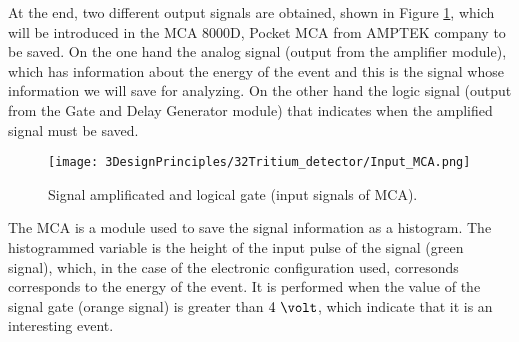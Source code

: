 At the end, two different output signals are obtained, shown in Figure \ref{fig:InputSignalsMCA}, which will be introduced in the MCA 8000D, Pocket MCA from AMPTEK company \cite{DataSheetMCA} to be saved. On the one hand the analog signal (output from the amplifier module), which has information about the energy of the event and this is the signal whose information we will save for analyzing. On the other hand the logic signal (output from the Gate and Delay Generator module) that indicates when the amplified signal must be saved.

\begin{figure}[htbp]
\centering
\texttt{[image: 3DesignPrinciples/32Tritium\_detector/Input\_MCA.png]}
\caption{Signal amplificated and logical gate (input signals of MCA).\label{fig:InputSignalsMCA}}
\end{figure}

The MCA is a module used to save the signal information as a histogram. The histogrammed variable is the height of the input pulse of the signal (green signal), which, in the case of the electronic configuration used, corresonds corresponds to the energy of the event. It is performed when the value of the signal gate (orange signal) is greater than $4~\volt$, which indicate that it is an interesting event.


